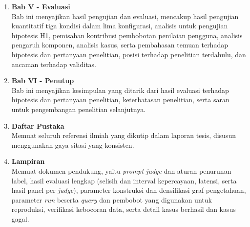 \begin{enumerate}
    \item \textbf{Bab V - Evaluasi}\\
      Bab ini menyajikan hasil pengujian dan evaluasi, mencakup hasil pengujian kuantitatif tiga kondisi dalam lima konfigurasi, analisis untuk pengujian hipotesis H1, pemisahan kontribusi pembobotan penilaian pengguna, analisis pengaruh komponen, analisis kasus, serta pembahasan temuan terhadap hipotesis dan pertanyaan penelitian, posisi terhadap penelitian terdahulu, dan ancaman terhadap validitas.

    \item \textbf{Bab VI - Penutup}\\
    Bab ini menyajikan kesimpulan yang ditarik dari hasil evaluasi terhadap hipotesis dan pertanyaan penelitian, keterbatasan penelitian, serta saran untuk pengembangan penelitian selanjutnya.

    \item \textbf{Daftar Pustaka}\\
    Memuat seluruh referensi ilmiah yang dikutip dalam laporan tesis, disusun menggunakan gaya sitasi yang konsisten.

    \item \textbf{Lampiran}\\
    Memuat dokumen pendukung, yaitu \emph{prompt judge} dan aturan penurunan label, hasil evaluasi lengkap (selisih dan interval kepercayaan, latensi, serta hasil panel per \emph{judge}), parameter konstruksi dan densifikasi graf pengetahuan, parameter \emph{run} beserta \emph{query} dan pembobot yang digunakan untuk reproduksi, verifikasi kebocoran data, serta detail kasus berhasil dan kasus gagal.
\end{enumerate}